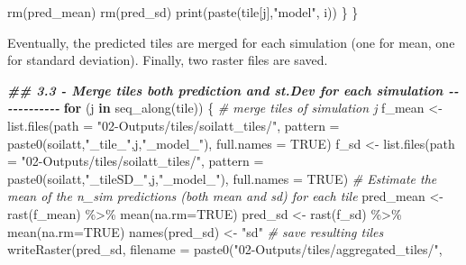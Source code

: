 \documentclass[
  10pt,
  b5paper,
  oneside]{book}
\newenvironment{Shaded}{\begin{snugshade}}{\end{snugshade}}
\newcommand{\AttributeTok}[1]{\textcolor[rgb]{0.77,0.63,0.00}{#1}}
\newcommand{\CommentTok}[1]{\textcolor[rgb]{0.56,0.35,0.01}{\textit{#1}}}
\newcommand{\ConstantTok}[1]{\textcolor[rgb]{0.00,0.00,0.00}{#1}}
\newcommand{\ControlFlowTok}[1]{\textcolor[rgb]{0.13,0.29,0.53}{\textbf{#1}}}
\newcommand{\DocumentationTok}[1]{\textcolor[rgb]{0.56,0.35,0.01}{\textbf{\textit{#1}}}}
\newcommand{\FunctionTok}[1]{\textcolor[rgb]{0.00,0.00,0.00}{#1}}
\newcommand{\NormalTok}[1]{#1}
\newcommand{\OtherTok}[1]{\textcolor[rgb]{0.56,0.35,0.01}{#1}}
\newcommand{\SpecialCharTok}[1]{\textcolor[rgb]{0.00,0.00,0.00}{#1}}
\newcommand{\StringTok}[1]{\textcolor[rgb]{0.31,0.60,0.02}{#1}}
\begin{document}
\begin{Shaded}
\begin{Highlighting}[]
    \FunctionTok{rm}\NormalTok{(pred\_mean)}
    \FunctionTok{rm}\NormalTok{(pred\_sd)}
    \FunctionTok{print}\NormalTok{(}\FunctionTok{paste}\NormalTok{(tile[j],}\StringTok{"model"}\NormalTok{, i))}
\NormalTok{  \}}
\NormalTok{\}}
\end{Highlighting}
\end{Shaded}

Eventually, the predicted tiles are merged for each simulation (one for mean, one for standard deviation). Finally, two raster files are saved.

\begin{Shaded}
\begin{Highlighting}[]
\DocumentationTok{\#\# 3.3 {-} Merge tiles both prediction and st.Dev for each simulation {-}{-}{-}{-}{-}{-}{-}{-}{-}{-}{-}{-}}
\ControlFlowTok{for}\NormalTok{ (j }\ControlFlowTok{in} \FunctionTok{seq\_along}\NormalTok{(tile)) \{}
  \CommentTok{\# merge tiles of simulation j}
\NormalTok{  f\_mean }\OtherTok{\textless{}{-}} \FunctionTok{list.files}\NormalTok{(}\AttributeTok{path =} \StringTok{"02{-}Outputs/tiles/soilatt\_tiles/"}\NormalTok{, }
                       \AttributeTok{pattern =} \FunctionTok{paste0}\NormalTok{(soilatt,}\StringTok{"\_tile\_"}\NormalTok{,j,}\StringTok{"\_model\_"}\NormalTok{), }
                       \AttributeTok{full.names =} \ConstantTok{TRUE}\NormalTok{)}
\NormalTok{  f\_sd }\OtherTok{\textless{}{-}} \FunctionTok{list.files}\NormalTok{(}\AttributeTok{path =} \StringTok{"02{-}Outputs/tiles/soilatt\_tiles/"}\NormalTok{, }
                     \AttributeTok{pattern =}  \FunctionTok{paste0}\NormalTok{(soilatt,}\StringTok{"\_tileSD\_"}\NormalTok{,j,}\StringTok{"\_model\_"}\NormalTok{), }
                     \AttributeTok{full.names =} \ConstantTok{TRUE}\NormalTok{)}
  \CommentTok{\# Estimate the mean of the n\_sim predictions (both mean and sd) for each tile}
\NormalTok{  pred\_mean }\OtherTok{\textless{}{-}} \FunctionTok{rast}\NormalTok{(f\_mean) }\SpecialCharTok{\%\textgreater{}\%} \FunctionTok{mean}\NormalTok{(}\AttributeTok{na.rm=}\ConstantTok{TRUE}\NormalTok{)}
\NormalTok{  pred\_sd }\OtherTok{\textless{}{-}} \FunctionTok{rast}\NormalTok{(f\_sd) }\SpecialCharTok{\%\textgreater{}\%} \FunctionTok{mean}\NormalTok{(}\AttributeTok{na.rm=}\ConstantTok{TRUE}\NormalTok{)}
  \FunctionTok{names}\NormalTok{(pred\_sd) }\OtherTok{\textless{}{-}} \StringTok{"sd"}
  \CommentTok{\# save resulting tiles}
  \FunctionTok{writeRaster}\NormalTok{(pred\_sd, }
              \AttributeTok{filename =} \FunctionTok{paste0}\NormalTok{(}\StringTok{"02{-}Outputs/tiles/aggregated\_tiles/"}\NormalTok{,}

\end{Highlighting}
\end{Shaded}
\end{document}
